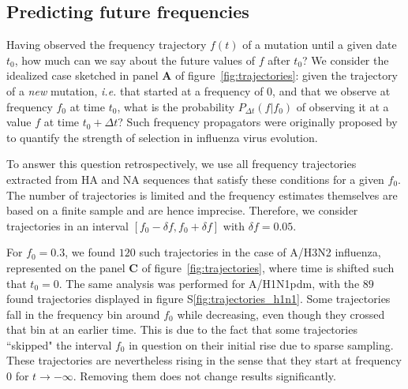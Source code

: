 \documentclass[reprint,amsmath,amssymb,superscriptaddress,showpacs,rmp]{revtex4-1}
\newcommand{\sref}[1]{S\ref{#1}}
\begin{document}

\subsection*{Predicting future frequencies}
Having observed the frequency trajectory $f(t)$ of a mutation until a given date $t_0$, how much can we say about the future values of $f$ after $t_0$?
We consider the idealized case sketched in panel \textbf{A} of figure~\ref{fig:trajectories}: given the trajectory of a \emph{new} mutation, \emph{i.e.} that started at a frequency of 0, and that we observe at frequency $f_0$ at time $t_0$, what is the probability $P_{\Delta t}(f\vert f_0)$ of observing it at a value $f$ at time $t_0 + \Delta t$?
Such frequency propagators were originally proposed by \citep{strelkowa_clonal_2012} to quantify the strength of selection in influenza virus evolution.

To answer this question retrospectively, we use all frequency trajectories extracted from HA and NA sequences that satisfy these conditions for a given $f_0$.  The number of trajectories is limited and the frequency estimates themselves are based on a finite sample and are hence imprecise.
Therefore, we consider trajectories in an interval $[f_0-\delta f, f_0+\delta f]$ with $\delta f = 0.05$.

For $f_0=0.3$, we found $120$ such trajectories in the case of A/H3N2 influenza, represented on the panel \textbf{C} of figure~\ref{fig:trajectories}, where time is shifted such that $t_0 = 0$. The same analysis was performed for A/H1N1pdm, with the $89$ found trajectories displayed in figure \sref{fig:trajectories_h1n1}.
Some trajectories fall in the frequency bin around $f_0$ while decreasing, even though they crossed that bin at an earlier time.
This is due to the fact that some trajectories ``skipped" the interval $f_0$ in question on their initial rise due to sparse sampling.
These trajectories are nevertheless rising in the sense that they start at frequency 0 for $t\rightarrow -\infty$.
Removing them does not change results significantly.
\end{document}
